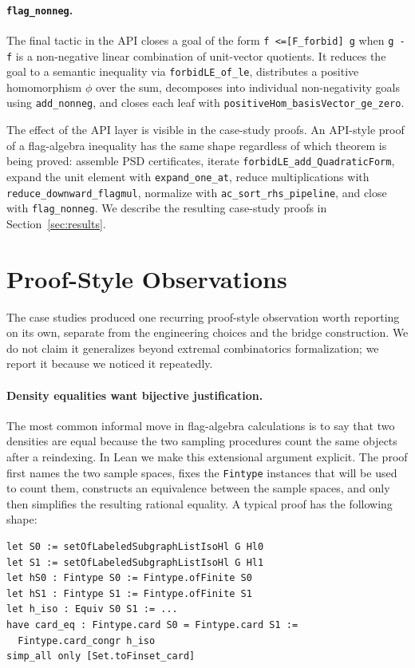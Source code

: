 \documentclass{article}
\newcommand{\lean}[1]{\texttt{#1}}
\begin{document}
\paragraph{\lean{flag\_nonneg}.}
The final tactic in the API closes a goal of the form
\lean{f <=[F\_forbid] g} when \lean{g - f} is a non-negative linear
combination of unit-vector quotients.  It reduces the goal to a semantic
inequality via \lean{forbidLE\_of\_le}, distributes a positive homomorphism
$\phi$ over the sum, decomposes into individual non-negativity goals using
\lean{add\_nonneg}, and closes each leaf with
\lean{positiveHom\_basisVector\_ge\_zero}.

The effect of the API layer is visible in the case-study proofs.  An
API-style proof of a flag-algebra inequality has the same shape regardless
of which theorem is being proved: assemble PSD certificates, iterate
\lean{forbidLE\_add\_QuadraticForm}, expand the unit element with
\lean{expand\_one\_at}, reduce multiplications with
\lean{reduce\_downward\_flagmul}, normalize with \lean{ac\_sort\_rhs\_pipeline},
and close with \lean{flag\_nonneg}.  We describe the resulting case-study
proofs in Section~\ref{sec:results}.


\section{Proof-Style Observations}
\label{sec:proof-style}

The case studies produced one recurring proof-style observation worth
reporting on its own, separate from the engineering choices and the bridge
construction.  We do not claim it generalizes beyond extremal combinatorics
formalization; we report it because we noticed it repeatedly.

\paragraph{Density equalities want bijective justification.}
The most common informal move in flag-algebra calculations is to say that
two densities are equal because the two sampling procedures count the same
objects after a reindexing.  In Lean we make this extensional argument
explicit.  The proof first names the two sample spaces, fixes the
\lean{Fintype} instances that will be used to count them, constructs an
equivalence between the sample spaces, and only then simplifies the resulting
rational equality.  A typical proof has the following shape:
\begin{lstlisting}
let S0 := setOfLabeledSubgraphListIsoHl G Hl0
let S1 := setOfLabeledSubgraphListIsoHl G Hl1
let hS0 : Fintype S0 := Fintype.ofFinite S0
let hS1 : Fintype S1 := Fintype.ofFinite S1
let h_iso : Equiv S0 S1 := ...
have card_eq : Fintype.card S0 = Fintype.card S1 :=
  Fintype.card_congr h_iso
simp_all only [Set.toFinset_card]
\end{lstlisting}
\end{document}
